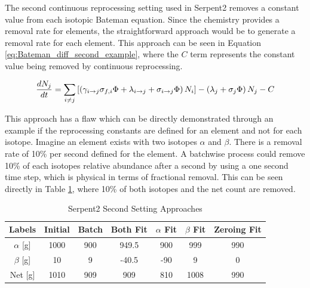 The second continuous reprocessing setting used in Serpent2 removes a constant value from each isotopic Bateman equation. Since the chemistry provides a removal rate for elements, the straightforward approach would be to generate a removal rate for each element. This approach can be seen in Equation \ref{eq:Bateman_diff_second_example}, where the $C$ term represents the constant value being removed by continuous reprocessing.

\begin{equation} \hfill
\frac{dN_j}{dt} = \sum_{i \neq j} \left [ \left( \gamma_{i \rightarrow j} \sigma_{f, i} \Phi + \lambda _{i \rightarrow j} + \sigma_{i \rightarrow j} \Phi \right) N_i \right ] - \left ( \lambda_j + \sigma_j \Phi \right ) N_j - C
\hfill\label{eq:Bateman_diff_second_example} \end{equation}

This approach has a flaw which can be directly demonstrated through an example if the reprocessing constants are defined for an element and not for each isotope. Imagine an element exists with two isotopes $\alpha$ and $\beta$. There is a removal rate of 10\% per second defined for the element. A batchwise process could remove 10\% of each isotopes relative abundance after a second by using a one second time step, which is physical in terms of fractional removal. This can be seen directly in Table \ref{tab:cont_repr_appr}, where 10\% of both isotopes and the net count are removed.

\begin{table}[ht]
\renewcommand{\arraystretch}{1.25}
\caption{Serpent2 Second Setting Approaches}
\label{tab:cont_repr_appr}
\begin{center}
\begin{tabular}{ c | c | c | c | c | c | c }
 \hline
 Labels & Initial & Batch & Both Fit & $\alpha$ Fit & $\beta$ Fit & Zeroing Fit\\
 \hline
 \hline
$\alpha$ [g] & 1000 & 900 & 949.5 & 900 & 999 & 990\\
$\beta$ [g] & 10 & 9 & -40.5 & -90 & 9 & 0\\
 \hline
 Net [g] & 1010 & 909 & 909 & 810 & 1008 & 990 \\
 \hline
\end{tabular}
\end{center}
\end{table}

